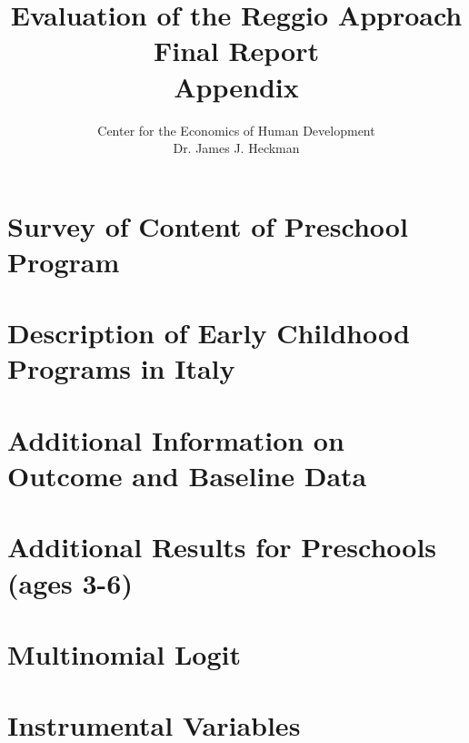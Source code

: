 

\setcounter{table}{0}
\renewcommand{\thetable}{A\arabic{table}}
\setcounter{figure}{0}
\renewcommand{\thefigure}{A\arabic{figure}}





\title{\Large \textbf{Evaluation of the Reggio Approach \\ Final Report \\ Appendix}}
\author{\normalsize Center for the Economics of Human Development \\ Dr. James J. Heckman}
\maketitle

\clearpage

\tableofcontents

\doublespacing

\begin{appendices}

\section{Survey of Content of Preschool Program}\label{sec:survey}


\section{Description of Early Childhood Programs in Italy}\label{sec:programdes}


\section{Additional Information on Outcome and Baseline Data}\label{sec:data-app}


\section{Additional Results for Preschools (ages 3-6)}\label{sec:results}


\section{Multinomial Logit}\label{sec:multi-logit}

\clearpage

\section{Instrumental Variables}\label{sec:iv}

\clearpage


\end{appendices}





